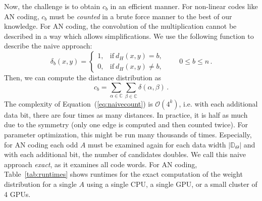 Now, the challenge is to obtain \(c_b\) in an efficient manner. For non-linear codes like AN coding, \(c_b\) must be \emph{counted} in a brute force manner to the best of our knowledge. For AN coding, the convolution of the multiplication cannot be described in a way which allows simplifications. We use the following function to describe the naive approach:
\begin{equation}
	\delta_b (x, y) = \begin{cases}
		1,&\mathrm{if}\ {d_H(x,y)=b}, \\
		0,&\mathrm{if}\ {d_H(x,y)\neq b,}
	\end{cases}
	\qquad0\le b\le n\,.\nonumber
	\label{eq:delta}
\end{equation}
Then, we can compute the distance distribution as
\begin{equation}
	c_b = \sum_{\alpha\in\mathbb{C}} \sum_{\beta\in\mathbb{C}} \delta(\alpha, \beta)\,.
	\label{eq:naivecount}
\end{equation}
The complexity of Equation~(\ref{eq:naivecount}) is $\mathcal{O}(4^k)$, i.e. with each additional data bit, there are four times as many distances. In practice, it is half as much due to the symmetry (only one edge is computed and then counted twice). For parameter optimization, this might be run many thousands of times. Especially, for AN coding each odd \(A\) must be examined again for each data width \(|\mathbb{D}_\Theta|\) and with each additional bit, the number of candidates doubles. We call this naive approach \emph{exact}, as it examines all code words. For AN coding, Table~\ref{tab:runtimes} shows runtimes for the exact computation of the weight distribution for a single \(A\) using a single CPU, a single GPU, or a small cluster of 4 GPUs.




